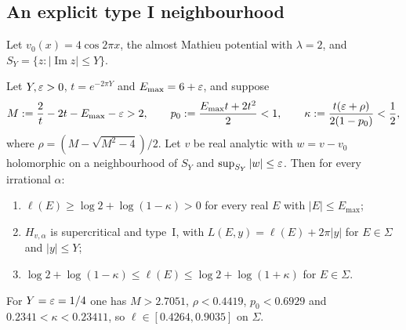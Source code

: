 \subsection{An explicit type I neighbourhood}

Let $v_0(x)=4\cos2\pi x$, the almost Mathieu potential with $\lambda=2$, and $S_Y=\{z:|\operatorname{Im}z|\le Y\}$.

\begin{theorem}\label{thm:nbhd}
Let $Y,\varepsilon>0$, $t=e^{-2\pi Y}$ and $E_{\max}=6+\varepsilon$, and suppose
\[
M:=\frac2t-2t-E_{\max}-\varepsilon>2,\qquad p_0:=\frac{E_{\max}t+2t^2}2<1,\qquad\kappa:=\frac{t(\varepsilon+\rho)}{2(1-p_0)}<\frac12,
\]
where $\rho=(M-\sqrt{M^2-4})/2$. Let $v$ be real analytic with $w=v-v_0$ holomorphic on a neighbourhood of $S_Y$ and $\sup_{S_Y}|w|\le\varepsilon$. Then for every irrational $\alpha$:
\begin{enumerate}
\item $\ell(E)\ge\log2+\log(1-\kappa)>0$ for every real $E$ with $|E|\le E_{\max}$;
\item $H_{v,\alpha}$ is supercritical and type~I, with $L(E,y)=\ell(E)+2\pi|y|$ for $E\in\Sigma$ and $|y|\le Y$;
\item $\log2+\log(1-\kappa)\le\ell(E)\le\log2+\log(1+\kappa)$ for $E\in\Sigma$.
\end{enumerate}
For $Y=\varepsilon=1/4$ one has $M>2.7051$, $\rho<0.4419$, $p_0<0.6929$ and $0.2341<\kappa<0.23411$, so $\ell\in[0.4264,0.9035]$ on $\Sigma$.
\end{theorem}

